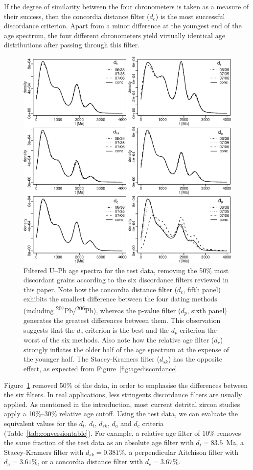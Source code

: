 \documentclass[gchron, manuscript]{copernicus}
\begin{document}
If the degree of similarity between the four chronometers is taken as
a measure of their success, then the concordia distance filter ($d_c$)
is the most successful discordance criterion. Apart from a minor
difference at the youngest end of the age spectrum, the four different
chronometers yield virtually identical age distributions after passing
through this filter.

\begin{figure}[t]
  \includegraphics[width=12cm]{KDEs.pdf}
  \caption{Filtered U--Pb age spectra for the test data, removing the
    50\% most discordant grains according to the six discordance
    filters reviewed in this paper. Note how the concordia distance
    filter ($d_c$, fifth panel) exhibits the smallest difference
    between the four dating methods (including
    \textsuperscript{207}Pb/\textsuperscript{206}Pb), whereas the
    p-value filter ($d_p$, sixth panel) generates the greatest
    differences between them.  This observation suggests that the
    $d_c$ criterion is the best and the $d_p$ criterion the worst of
    the six methods. Also note how the relative age filter ($d_r$)
    strongly inflates the older half of the age spectrum at the
    expense of the younger half. The Stacey-Kramers filter ($d_{sk}$)
    has the opposite effect, as expected from
    Figure~\ref{fig:agediscordance}.}
  \label{fig:KDEs}
\end{figure}

Figure~\ref{fig:KDEs} removed 50\% of the data, in order to emphasise
the differences between the six filters. In real applications, less
stringents discordance filters are usually applied. As mentioned in
the introduction, most current detrital zircon studies apply a
10\%--30\% relative age cutoff.  Using the test data, we can evaluate
the equivalent values for the $d_t$, $d_t$, $d_{sk}$, $d_a$ and $d_c$
criteria (Table~\ref{tab:conversiontable}). For example, a relative
age filter of 10\% removes the same fraction of the test data as an
absolute age filter with $d_t=83.5$~Ma, a Stacey-Kramers filter with
$d_{sk}=0.381$\%, a perpendicular Aitchison filter with $d_a=3.61$\%,
or a concordia distance filter with $d_c=3.67$\%.
\end{document}
